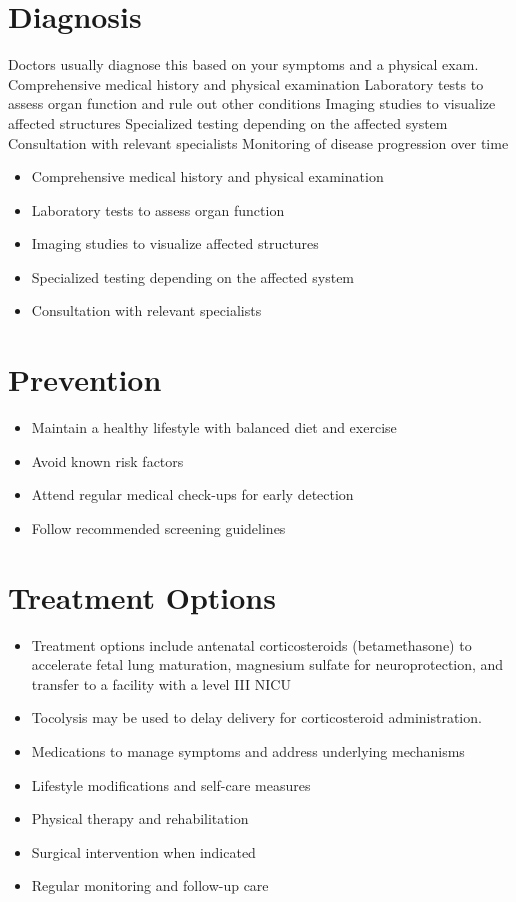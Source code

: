 \section{Diagnosis}
Doctors usually diagnose this based on your symptoms and a physical exam. Comprehensive medical history and physical examination Laboratory tests to assess organ function and rule out other conditions Imaging studies to visualize affected structures Specialized testing depending on the affected system Consultation with relevant specialists Monitoring of disease progression over time

\begin{itemize}[noitemsep]
  \item Comprehensive medical history and physical examination
  \item Laboratory tests to assess organ function
  \item Imaging studies to visualize affected structures
  \item Specialized testing depending on the affected system
  \item Consultation with relevant specialists
\end{itemize}
\section{Prevention}
\begin{itemize}[noitemsep]
  \item Maintain a healthy lifestyle with balanced diet and exercise
  \item Avoid known risk factors
  \item Attend regular medical check-ups for early detection
  \item Follow recommended screening guidelines
\end{itemize}
\section{Treatment Options}
\begin{itemize}[noitemsep]
  \item Treatment options include antenatal corticosteroids (betamethasone) to accelerate fetal lung maturation, magnesium sulfate for neuroprotection, and transfer to a facility with a level III NICU
  \item Tocolysis may be used to delay delivery for corticosteroid administration.
  \item Medications to manage symptoms and address underlying mechanisms
  \item Lifestyle modifications and self-care measures
  \item Physical therapy and rehabilitation
  \item Surgical intervention when indicated
  \item Regular monitoring and follow-up care
\end{itemize}

